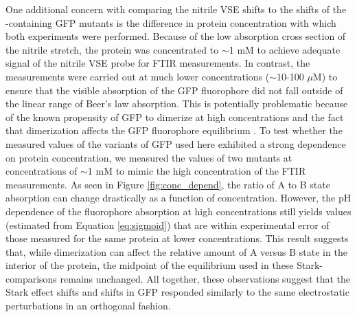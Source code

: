 One additional concern with comparing the nitrile VSE shifts to the \pKa{} shifts of the \pCNF{}-containing GFP mutants is the difference in protein concentration with which both experiments were performed.
Because of the low absorption cross section of the nitrile stretch, the protein was concentrated to $\sim$1 mM to achieve adequate signal of the nitrile VSE probe for FTIR measurements. 
In contrast, the \pKa{} measurements were carried out at much lower concentrations ($\sim$10-100 $\mu$M) to ensure that the visible absorption of the GFP fluorophore did not fall outside of the linear range of Beer's law absorption.
This is potentially problematic because of the known propensity of GFP to dimerize at high concentrations and the fact that dimerization affects the GFP fluorophore equilibrium \cite{Tsien1998}.
To test whether the measured \pKa{} values of the variants of GFP used here exhibited a strong dependence on protein concentration, we measured the \pKa{} values of two mutants at concentrations of $\sim$1 mM to mimic the high concentration of the FTIR measurements.
As seen in Figure \ref{fig:conc_depend}, the ratio of A to B state absorption can change drastically as a function of concentration.
However, the pH dependence of the fluorophore absorption at high concentrations still yields \pKa{} values (estimated from Equation \ref{eq:sigmoid}) that are within experimental error of those measured for the same protein at lower concentrations.
This result suggests that, while dimerization can affect the relative amount of A versus B state in the interior of the protein, the midpoint of the equilibrium used in these Stark-\pKa{} comparisons remains unchanged.
All together, these observations suggest that the Stark effect shifts and \pKa{} shifts in GFP responded similarly to the same electrostatic perturbations in an orthogonal fashion.

